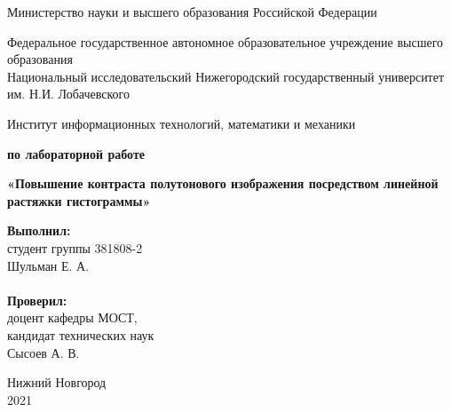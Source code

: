\documentclass{report}
\begin{document}
\begin{titlepage}

\begin{center}
Министерство науки и высшего образования Российской Федерации
\end{center}

\begin{center}
Федеральное государственное автономное образовательное учреждение высшего образования \\
Национальный исследовательский Нижегородский государственный университет им. Н.И. Лобачевского
\end{center}

\begin{center}
Институт информационных технологий, математики и механики
\end{center}

\vspace{4em}

\begin{center}
\textbf{ по лабораторной работе} \\
\end{center}
\begin{center}
\textbf{\Large«Повышение контраста полутонового изображения посредством линейной растяжки гистограммы»} \\
\end{center}

\vspace{4em}

\newbox{\lbox}
\newlength{\maxl}
\setlength{\maxl}{\wd\lbox}
\hfill\parbox{7cm}{
\hspace*{5cm}\hspace*{-5cm}\textbf{Выполнил:} \\ студент группы 381808-2 \\ Шульман Е. А.\\
\\
\hspace*{5cm}\hspace*{-5cm}\textbf{Проверил:}\\ доцент кафедры МОСТ, \\ кандидат технических наук \\ Сысоев А. В. \\
}
\vspace{\fill}

\begin{center} Нижний Новгород \\ 2021 \end{center}

\end{titlepage}
\end{document}
